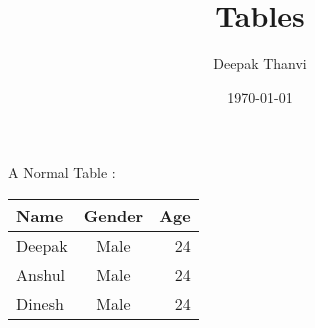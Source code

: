 \documentclass{article}
\title{Tables}
\author{Deepak Thanvi}
\date{\today}
\begin{document}
\maketitle

A Normal Table :


\begin{tabular}{|l|c|r|} %


	\hline %
	Name & Gender & Age\\ %
	\hline
	Deepak & Male & 24\\
	\hline
	Anshul & Male & 24\\
	\hline
	Dinesh & Male & 24\\
	\hline

\end{tabular}
\end{document}
